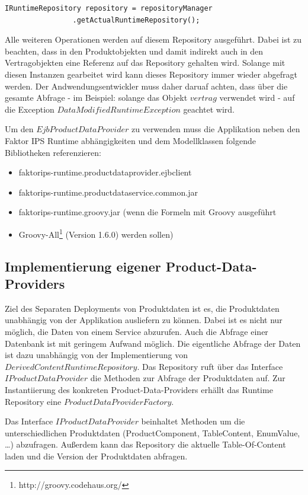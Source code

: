 \documentclass[headsepline=true, footsepline=true]{scrartcl}
\begin{document}
\begin{lstlisting}[caption=Aktuelles Repository vom Manager
abrufen,label=getRepository]
		IRuntimeRepository repository = repositoryManager
				.getActualRuntimeRepository();
\end{lstlisting}

Alle weiteren Operationen werden auf diesem Repository ausgeführt. Dabei ist zu
beachten, dass in den Produktobjekten und damit indirekt auch in den
Vertragobjekten eine Referenz auf das Repository gehalten wird. Solange mit
diesen Instanzen gearbeitet wird kann dieses Repository immer wieder abgefragt
werden. Der Andwendungsentwickler muss daher daruaf achten, dass über die
gesamte Abfrage - im Beispiel: solange das Objekt $vertrag$ verwendet wird - auf
die Exception $DataModifiedRuntimeException$ geachtet wird.

Um den $EjbProductDataProvider$ zu verwenden muss die Applikation neben den
Faktor IPS Runtime abhängigkeiten und dem Modellklassen folgende Bibliotheken
referenzieren:

\begin{itemize}
	\item faktorips-runtime.productdataprovider.ejbclient
	\item faktorips-runtime.productdataservice.common.jar
	\item faktorips-runtime.groovy.jar (wenn die Formeln mit Groovy ausgeführt
	\item Groovy-All\footnote{http://groovy.codehaus.org/} (Version 1.6.0)
	werden sollen)
\end{itemize}

\subsection{Implementierung eigener Product-Data-Providers}

Ziel des Separaten Deployments von Produktdaten ist es, die Produktdaten
unabhängig von der Applikation ausliefern zu können. Dabei ist es nicht nur
möglich, die Daten von einem Service abzurufen. Auch die Abfrage einer
Datenbank ist mit geringem Aufwand möglich. Die eigentliche Abfrage der Daten
ist dazu unabhängig von der Implementierung von
$DerivedContentRuntimeRepository$. Das Repository ruft über das Interface $IProductDataProvider$ die
Methoden zur Abfrage der Produktdaten auf. Zur Instantiierung des konkreten
Product-Data-Providers erhällt das Runtime Repository eine
$ProductDataProviderFactory$.

Das Interface $IProductDataProvider$ beinhaltet Methoden um die
unterschiedlichen Produktdaten (ProductComponent, TableContent, EnumValue, \ldots) abzufragen.
Außerdem kann das Repository die aktuelle Table-Of-Content laden und die Version
der Produktdaten abfragen.
\end{document}
